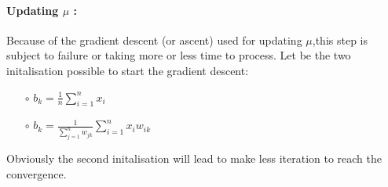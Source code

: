 \documentclass{article}
\begin{document}
            \paragraph{Updating $\mu$ : }
            Because of the gradient descent (or ascent) used for updating $\mu$,this step is subject to failure or taking more or less time to process.
            Let be the two initalisation possible to start the gradient descent: 
            \begin{itemize}
                \item[$\circ$]  $b_k = \frac{1}{n}\sum \limits_{i=1}^n x_i$
                \item[$\circ$]  $b_k = \frac{1}{\sum \limits_{j=1}^n w_{jk}}\sum \limits_{i=1}^n x_iw_{ik}$ 
            \end{itemize}
            Obviously the second initalisation will lead to make less iteration to reach the convergence.
\end{document}
